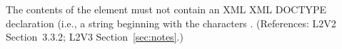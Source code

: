 The contents of the  element must not contain an XML XML
DOCTYPE declaration (i.e., a string beginning with the characters
.  (References: L2V2 Section~3.3.2;
L2V3 Section~\ref{sec:notes}.)
